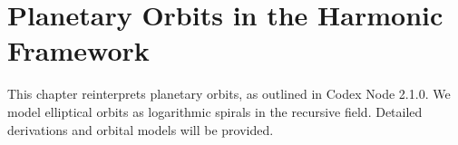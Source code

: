 \section{Planetary Orbits in the Harmonic Framework}
This chapter reinterprets planetary orbits, as outlined in Codex Node 2.1.0. We model elliptical orbits as logarithmic spirals in the recursive field. Detailed derivations and orbital models will be provided.